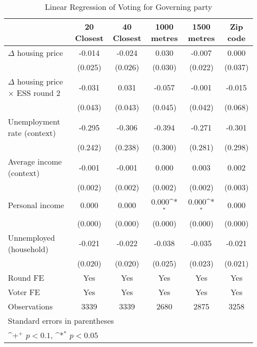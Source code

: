 \begin{table}[htbp]\centering
\def\sym#1{\ifmmode^{#1}\else\(^{#1}\)\fi}
\caption{Linear Regression of Voting for Governing party } \footnotesize \label{wave1}
\begin{tabular}{l*{5}{c}}
\hline\hline
                    &\multicolumn{1}{c}{20 Closest}&\multicolumn{1}{c}{40 Closest}&\multicolumn{1}{c}{1000 metres}&\multicolumn{1}{c}{1500 metres}&\multicolumn{1}{c}{Zip code}\\
\hline
$\Delta$ housing price&      -0.014       &      -0.024       &       0.030       &      -0.007       &       0.000       \\
                    &     (0.025)       &     (0.026)       &     (0.030)       &     (0.022)       &     (0.037)       \\
[1em]
$\Delta$ housing price $\times$ ESS round 2&      -0.031       &       0.031       &      -0.057       &      -0.001       &      -0.015       \\
                    &     (0.043)       &     (0.043)       &     (0.045)       &     (0.042)       &     (0.068)       \\
[1em]
Unemployment rate (context)&      -0.295       &      -0.306       &      -0.394       &      -0.271       &      -0.301       \\
                    &     (0.242)       &     (0.238)       &     (0.300)       &     (0.281)       &     (0.298)       \\
[1em]
Average income (context)&      -0.001       &      -0.001       &       0.000       &       0.003       &       0.002       \\
                    &     (0.002)       &     (0.002)       &     (0.002)       &     (0.002)       &     (0.003)       \\
[1em]
Personal income     &       0.000       &       0.000       &       0.000\sym{*}&       0.000\sym{*}&       0.000       \\
                    &     (0.000)       &     (0.000)       &     (0.000)       &     (0.000)       &     (0.000)       \\
[1em]
Unnemployed (household)&      -0.021       &      -0.022       &      -0.038       &      -0.035       &      -0.021       \\
                    &     (0.020)       &     (0.020)       &     (0.025)       &     (0.023)       &     (0.021)       \\
[1em]
\hline  Round FE    &         Yes       &         Yes       &         Yes       &         Yes       &         Yes       \\
[1em]
Voter FE            &         Yes       &         Yes       &         Yes       &         Yes       &         Yes       \\
\hline
Observations        &        3339       &        3339       &        2680       &        2875       &        3258       \\
\hline\hline
\multicolumn{6}{l}{\footnotesize Standard errors in parentheses}\\
\multicolumn{6}{l}{\footnotesize \sym{+} \(p<0.1\), \sym{*} \(p<0.05\)}\\
\end{tabular}
\end{table}

